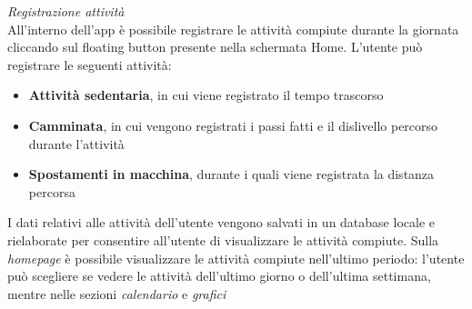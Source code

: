 \documentclass{article}
\begin{document}
\begin{center}
    \begin{figure}[h]
        \centering
    \end{figure}
\end{center}
\textit{Registrazione attività} \vspace*{7pt}\\
All'interno dell'app è possibile registrare le attività compiute durante la giornata cliccando sul floating button presente nella schermata Home. L'utente può registrare le seguenti attività:
\begin{itemize}
    \renewcommand{\labelitemi}{-}
    \item \textbf{Attività sedentaria}, in cui viene registrato il tempo trascorso
    \item \textbf{Camminata}, in cui vengono registrati i passi fatti e il dislivello percorso durante l'attività
    \item \textbf{Spostamenti in macchina}, durante i quali viene registrata la distanza percorsa
\end{itemize}
I dati relativi alle attività dell'utente vengono salvati in un database locale e rielaborate per consentire all'utente di visualizzare le attività compiute.
Sulla \textit{homepage} è possibile visualizzare le attività compiute nell'ultimo periodo: l'utente può scegliere se vedere le attività dell'ultimo giorno o dell'ultima settimana, mentre nelle sezioni \textit{calendario} e \textit{grafici}
\newpage
\end{document}
